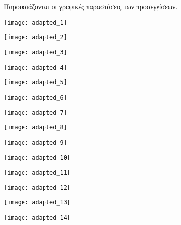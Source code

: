 \newpage
Παρουσιάζονται οι γραφικές παραστάσεις των προσεγγίσεων.
\begin{multicols}{2}

\begin{Figure}
	\texttt{[image: adapted\_1]}
	\label{fig:adapted-1}
\end{Figure}
\begin{Figure}
	\texttt{[image: adapted\_2]}
	\label{fig:adapted-2}
\end{Figure}
\begin{Figure}
	\texttt{[image: adapted\_3]}
	\label{fig:adapted-3}
\end{Figure}
\begin{Figure}
	\texttt{[image: adapted\_4]}
	\label{fig:adapted-4}
\end{Figure}
\begin{Figure}
	\texttt{[image: adapted\_5]}
	\label{fig:adapted-5}
\end{Figure}
\begin{Figure}
	\texttt{[image: adapted\_6]}
	\label{fig:adapted-6}
\end{Figure}
\begin{Figure}
	\texttt{[image: adapted\_7]}
	\label{fig:adapted-7}
\end{Figure}
\begin{Figure}
	\texttt{[image: adapted\_8]}
	\label{fig:adapted-8}
\end{Figure}
\begin{Figure}
	\texttt{[image: adapted\_9]}
	\label{fig:adapted-9}
\end{Figure}
\begin{Figure}
	\texttt{[image: adapted\_10]}
	\label{fig:adapted-10}
\end{Figure}
\begin{Figure}
	\texttt{[image: adapted\_11]}
	\label{fig:adapted-11}
\end{Figure}
\begin{Figure}
	\texttt{[image: adapted\_12]}
	\label{fig:adapted-12}
\end{Figure}
\begin{Figure}
	\texttt{[image: adapted\_13]}
	\label{fig:adapted-13}
\end{Figure}
\begin{Figure}
	\texttt{[image: adapted\_14]}
	\label{fig:adapted-14}
\end{Figure}

\end{multicols}

